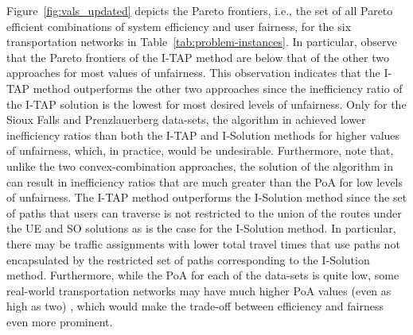 \documentclass{article}
\begin{document}
Figure~\ref{fig:vals_updated} depicts the Pareto frontiers, i.e., the set of all Pareto efficient combinations of system efficiency and user fairness, %
for the six transportation networks in Table~\ref{tab:problem-instances}. In particular, observe that the Pareto frontiers of the I-TAP method %
are below that of the other two approaches for most values of unfairness. This observation indicates that the I-TAP method outperforms the other two approaches since the inefficiency ratio of the I-TAP solution is the lowest for most desired levels of unfairness. %
Only for the Sioux Falls and Prenzlauerberg data-sets, the algorithm in \cite{so-routing-seminal} achieved lower inefficiency ratios than both the I-TAP and I-Solution methods for higher values of unfairness, which, in practice, would be undesirable. Furthermore, note that, unlike the two convex-combination approaches, the solution of the algorithm in \cite{so-routing-seminal} can result in inefficiency ratios that are much greater than the PoA for low levels of unfairness. %
The I-TAP method outperforms the I-Solution method since the set of paths that users can traverse is not restricted to the union of the routes under the UE and SO solutions as is the case for the I-Solution method. In particular, there may be traffic assignments with lower total travel times that use paths not encapsulated by the restricted set of paths corresponding to the I-Solution method. Furthermore, while the PoA for each of the data-sets is quite low, some real-world transportation networks may have much higher PoA values (even as high as two) \cite{boston-large-poa}, which would make the trade-off between efficiency and fairness even more prominent.

\end{document}

